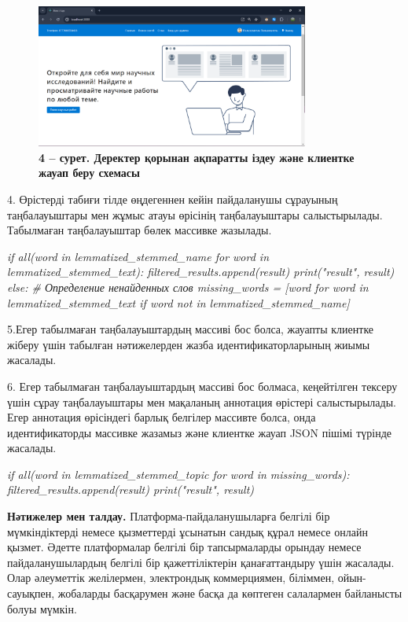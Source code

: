 \begin{figure}[H]
	\centering
	\includegraphics[width=0.8\textwidth]{assets/145}
	\caption*{\bfseries 4 -- сурет. Деректер қорынан ақпаратты іздеу және клиентке жауап
  беру схемасы}
\end{figure}

4. Өрістерді табиғи тілде өңдегеннен кейін пайдаланушы сұрауының
таңбалауыштары мен жұмыс атауы өрісінің таңбалауыштары салыстырылады.
Табылмаған таңбалауыштар бөлек массивке жазылады.

\emph{if all(word in lemmatized\_stemmed\_name for word in
lemmatized\_stemmed\_text): filtered\_results.append(result)
print("result", result) else: \# Определение ненайденных слов
missing\_words = {[}word for word in lemmatized\_stemmed\_text if word
not in lemmatized\_stemmed\_name{]}}

5.Егер табылмаған таңбалауыштардың массиві бос болса, жауапты клиентке
жіберу үшін табылған нәтижелерден жазба идентификаторларының жиымы
жасалады.

6. Егер табылмаған таңбалауыштардың массиві бос болмаса, кеңейтілген
тексеру үшін сұрау таңбалауыштары мен мақаланың аннотация өрістері
салыстырылады. Егер аннотация өрісіндегі барлық белгілер массивте болса,
онда идентификаторды массивке жазамыз және клиентке жауап JSON пішімі
түрінде жасалады.

\emph{if all(word in lemmatized\_stemmed\_topic for word in
missing\_words): filtered\_results.append(result) print("result",
result)}

{\bfseries Нәтижелер мен талдау.} Платформа-пайдаланушыларға белгілі бір
мүмкіндіктерді немесе қызметтерді ұсынатын сандық құрал немесе онлайн
қызмет. Әдетте платформалар белгілі бір тапсырмаларды орындау немесе
пайдаланушылардың белгілі бір қажеттіліктерін қанағаттандыру үшін
жасалады. Олар әлеуметтік желілермен, электрондық коммерциямен,
біліммен, ойын-сауықпен, жобаларды басқарумен және басқа да көптеген
салалармен байланысты болуы мүмкін.

